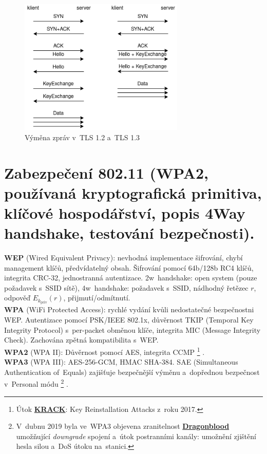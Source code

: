 \begin{figure}[ht]
    \centering
    \includegraphics[width=0.7\textwidth]{images/tls}
    \caption*{Výměna zpráv v~TLS 1.2 a~TLS 1.3}
\end{figure}

\clearpage
\section{Zabezpečení 802.11 (WPA2, používaná kryptografická primitiva, klíčové hospodářství, popis 4Way handshake, testování bezpečnosti).}

\textbf{WEP} (Wired Equivalent Privacy): nevhodná implementace šifrování, chybí management klíčů, předvídatelný obsah. Šifrování pomocí 64b/128b RC4 klíčů, integrita CRC-32, jednostranná autentizace. 2w~handshake: open system (pouze požadavek s~SSID sítě), 4w~handshake: požadavek s~SSID, nádhodný řetězec $r$, odpověď $E_{k_\mathrm{priv}}(r)$, přijmutí/odmítnutí. \\
\textbf{WPA} (WiFi Protected Access): rychlé vydání kvůli nedostatečné bezpečnostni WEP. Autentizace pomocí PSK/IEEE 802.1x, důvěrnost TKIP (Temporal Key Integrity Protocol) s~per-packet obměnou klíče, integrita MIC (Message Integrity Check). Zachována zpětná kompatibilita s~WEP. \\
\textbf{WPA2} (WPA II): Důvěrnost pomocí AES, integrita CCMP%
\footnote{Útok \href{https://krackattacks.com}{\textbf{KRACK}}: Key Reinstallation Attacks z~roku 2017.}%
. \\
\textbf{WPA3} (WPA III): AES-256-GCM, HMAC SHA-384. SAE (Simultaneous Authentication of~Equals) zajišťuje bezpečnější výměnu a~dopřednou bezpečnost v~Personal módu%
\footnote{V~dubnu 2019 byla ve~WPA3 objevena zranitelnost \href{https://wpa3.mathyvanhoef.com/}{\textbf{Dragonblood}} umožňující \emph{downgrade} spojení a~útok postranními kanály: umožnění zjištění hesla silou a~DoS útoku na~stanici.}%
.

